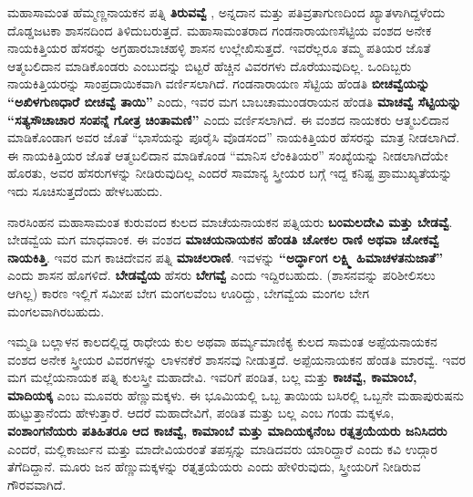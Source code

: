 ಮಹಾಸಾಮಂತ ಹೆಮ್ಮಣ್ಣನಾಯಕನ ಪತ್ನಿ \textbf{ತಿರುವವ್ವೆ }, ಅನ್ನದಾನ ಮತ್ತು ಪತಿವ್ರತಾಗುಣದಿಂದ ಖ್ಯಾತಳಾಗಿದ್ದಳೆಂದು ದೊಡ್ಡಜಟಕಾ ಶಾಸನದಿಂದ ತಿಳಿದುಬರುತ್ತದೆ. ಮಹಾಸಾಮಂತರಾದ ಗಂಡನಾರಾಯಣಸೆಟ್ಟಿಯ ವಂಶದ ಅನೇಕ ನಾಯಕಿತ್ತಿ\-ಯರ ಹೆಸರನ್ನು ಅಗ್ರಹಾರಬಾಚಹಳ್ಳಿ ಶಾಸನ ಉಲ್ಲೇಖಿಸುತ್ತದೆ. ಇವರೆಲ್ಲರೂ ತಮ್ಮ ಪತಿಯರ ಜೊತೆ ಆತ್ಮಬಲಿದಾನ ಮಾಡಿಕೊಂಡರು ಎಂಬುದನ್ನು ಬಿಟ್ಟರೆ ಹೆಚ್ಚಿನ ವಿವರಗಳು ದೊರೆಯುವುದಿಲ್ಲ. ಒಂದಿಬ್ಬರು ನಾಯಕಿತ್ತಿಯರನ್ನು ಸಾಂಪ್ರದಾಯಿಕ\-ವಾಗಿ ವರ್ಣಿಸಲಾಗಿದೆ. ಗಂಡನಾರಾಯಣ ಸೆಟ್ಟಿಯ ಹೆಂಡತಿ \textbf{ಬೀಚವ್ವೆಯನ್ನು “ಅಖಿಳಗುಣಧಾರೆ ಬೀಚವ್ವೆ ತಾಯಿ”} ಎಂದು, ಇವರ ಮಗ ಬಾಬಚಾಮುಂಡರಾಯನ ಹೆಂಡತಿ \textbf{ಮಾಚವ್ವೆ ಸೆಟ್ಟಿಯನ್ನು “ಸತ್ಯಸೌಚಾಚಾರ ಸಂಪನ್ನೆ ಗೋತ್ರ ಚಿಂತಾಮಣಿ”} ಎಂದು ವರ್ಣಿಸಲಾಗಿದೆ. ಈ ವಂಶದ ನಾಯಕರು ಆತ್ಮಬಲಿದಾನ ಮಾಡಿಕೊಂಡಾಗ ಅವರ ಜೊತೆ “ಭಾಸೆಯನ್ನು ಪೂರೈಸಿ ವೊಡಸಂದ” ನಾಯಕಿತ್ತಿಯರ ಹೆಸರನ್ನು ಮಾತ್ರ ನೀಡಲಾಗಿದೆ. ಈ ನಾಯಕಿತ್ತಿಯರ ಜೊತೆ ಆತ್ಮಬಲಿದಾನ ಮಾಡಿಕೊಂಡ “ಮಾನಿಸ ಲೆಂಕಿತಿಯರ” ಸಂಖ್ಯೆಯನ್ನು ನೀಡಲಾಗಿದೆಯೇ ಹೊರತು, ಅವರ ಹೆಸರುಗಳನ್ನು ನೀಡಿರುವುದಿಲ್ಲ ಎಂದರೆ ಸಾಮಾನ್ಯ ಸ್ತ್ರೀಯರ ಬಗ್ಗೆ ಇದ್ದ ಕನಿಷ್ಟ ಪ್ರಾಮುಖ್ಯತೆಯನ್ನು ಇದು ಸೂಚಿಸುತ್ತದೆಂದು ಹೇಳಬಹುದು.

ನಾರಸಿಂಹನ ಮಹಾಸಾಮಂತ ಕುರುವಂದ ಕುಲದ ಮಾಚೆಯನಾಯಕನ ಪತ್ನಿಯರು \textbf{ಬಂಮಲದೇವಿ ಮತ್ತು ಬೇಡವ್ವೆ}. ಬೇಡವ್ವೆಯ ಮಗ ಮಾಧವಾಂಕ. ಈ ವಂಶದ \textbf{ಮಾಚಯನಾಯಕನ ಹೆಂಡತಿ ಚೋಕಲ ರಾಣಿ ಅಥವಾ ಚೋಕವ್ವೆ ನಾಯಕಿತ್ತಿ}. ಇವರ ಮಗ ಕಾಚಿದೇವನ ಪತ್ನಿ \textbf{ಮಾಚಲರಾಣಿ}. ಇವಳನ್ನು \textbf{“ಅರ್ದ್ಧಾಂಗ ಲಕ್ಷ್ಮಿ ಹಿಮಾಚಳತನುಜಾತೆ”} ಎಂದು ಶಾಸನ ಹೊಗಳಿದೆ. \textbf{ಬೇಡವ್ವೆಯ} ಹೆಸರು \textbf{ಬೇಗವ್ವೆ} ಎಂದು ಇದ್ದಿರಬಹುದು. (ಶಾಸನವನ್ನು ಪರಿಶೀಲಿಸಲು ಆಗಿಲ್ಲ) ಕಾರಣ ಇಲ್ಲಿಗೆ ಸಮೀಪ ಬೇಗ ಮಂಗಲವೆಂಬ ಊರಿದ್ದು, ಬೇಗವ್ವೆಯ ಮಂಗಲ ಬೇಗ ಮಂಗಲವಾಗಿರಬಹುದು.

ಇಮ್ಮಡಿ ಬಲ್ಲಾಳನ ಕಾಲದಲ್ಲಿದ್ದ ರಾಧೇಯ ಕುಲ ಅಥವಾ ಹರ್ಮ್ಯಮಾಣಿಕ್ಯ ಕುಲದ ಸಾಮಂತ ಅಪ್ಪೆಯನಾಯಕನ ವಂಶದ ಅನೇಕ ಸ್ತ್ರೀಯರ ವಿವರಗಳನ್ನು ಲಾಳನಕೆರೆ ಶಾಸನವು ನೀಡುತ್ತದೆ. ಅಪ್ಪೆಯನಾಯಕನ ಹೆಂಡತಿ ಮಾರವ್ವೆ. ಇವರ ಮಗ ಮಲ್ಲೆಯನಾಯಕ ಪತ್ನಿ ಕುಲಸ್ತ್ರೀ ಮಹಾದೇವಿ. ಇವರಿಗೆ ಪಂಡಿತ, ಬಲ್ಲ ಮತ್ತು \textbf{ಕಾಚವ್ವೆ, ಕಾಮಾಂಬೆ, ಮಾದಿಯಕ್ಕ} ಎಂಬ ಮೂವರು ಹೆಣ್ಣುಮಕ್ಕಳು. ಈ ಭೂಮಿಯಲ್ಲಿ ಒಬ್ಬ ತಾಯಿಯ ಬಸಿರಲ್ಲಿ ಒಬ್ಬನೇ ಮಹಾಪುರುಷನು ಹುಟ್ಟುತ್ತಾನೆಂದು ಹೇಳುತ್ತಾರೆ. ಆದರೆ ಮಹಾದೇವಿಗೆ, ಪಂಡಿತ ಮತ್ತು ಬಲ್ಲ ಎಂಬ ಗಂಡು ಮಕ್ಕಳೂ, \textbf{ವಂಶಾಂಗನೆಯರು ಪತಿಹಿತರೂ ಆದ ಕಾಚವ್ವೆ, ಕಾಮಾಂಬೆ ಮತ್ತು ಮಾದಿಯಕ್ಕನೆಂಬ ರತ್ನತ್ರಯೆಯರು ಜನಿಸಿದರು} ಎಂದರೆ, ಮಲ್ಲಿಕಾರ್ಜುನ ಮತ್ತು ಮಾದೇವಿಯರಂತೆ ತಪಸ್ಸನ್ನು ಮಾಡಿದವರು ಯಾರಿದ್ದಾರೆ ಎಂದು ಕವಿ ಉದ್ಗಾರ ತೆಗೆದಿದ್ದಾನೆ. ಮೂರು ಜನ ಹೆಣ್ಣುಮಕ್ಕಳನ್ನು ರತ್ನತ್ರಯೆಯರು ಎಂದು ಹೇಳಿರುವುದು, ಸ್ತ್ರೀಯರಿಗೆ ನೀಡಿರುವ ಗೌರವವಾಗಿದೆ.

